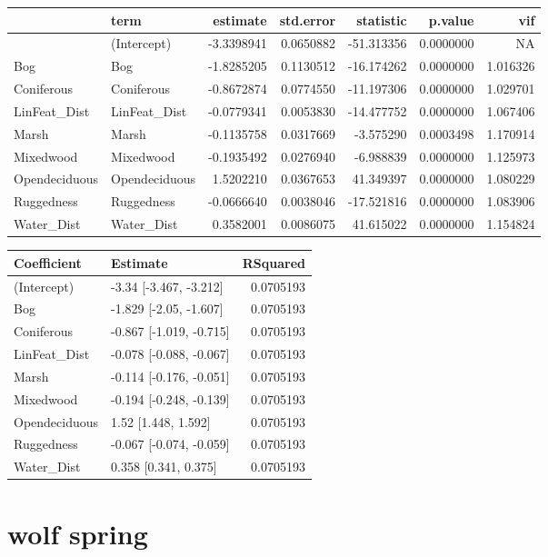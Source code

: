 \documentclass[]{article}
\begin{document}
\begin{tabular}{llrrrrr}
\toprule
  & term & estimate & std.error & statistic & p.value & vif\\
\midrule
 & (Intercept) & -3.3398941 & 0.0650882 & -51.313356 & 0.0000000 & NA\\
Bog & Bog & -1.8285205 & 0.1130512 & -16.174262 & 0.0000000 & 1.016326\\
Coniferous & Coniferous & -0.8672874 & 0.0774550 & -11.197306 & 0.0000000 & 1.029701\\
LinFeat\_Dist & LinFeat\_Dist & -0.0779341 & 0.0053830 & -14.477752 & 0.0000000 & 1.067406\\
Marsh & Marsh & -0.1135758 & 0.0317669 & -3.575290 & 0.0003498 & 1.170914\\
Mixedwood & Mixedwood & -0.1935492 & 0.0276940 & -6.988839 & 0.0000000 & 1.125973\\
Opendeciduous & Opendeciduous & 1.5202210 & 0.0367653 & 41.349397 & 0.0000000 & 1.080229\\
Ruggedness & Ruggedness & -0.0666640 & 0.0038046 & -17.521816 & 0.0000000 & 1.083906\\
Water\_Dist & Water\_Dist & 0.3582001 & 0.0086075 & 41.615022 & 0.0000000 & 1.154824\\
\bottomrule
\end{tabular}

\begin{tabular}{llr}
\toprule
Coefficient & Estimate & RSquared\\
\midrule
(Intercept) & -3.34 [-3.467, -3.212] & 0.0705193\\
Bog & -1.829 [-2.05, -1.607] & 0.0705193\\
Coniferous & -0.867 [-1.019, -0.715] & 0.0705193\\
LinFeat\_Dist & -0.078 [-0.088, -0.067] & 0.0705193\\
Marsh & -0.114 [-0.176, -0.051] & 0.0705193\\
Mixedwood & -0.194 [-0.248, -0.139] & 0.0705193\\
Opendeciduous & 1.52 [1.448, 1.592] & 0.0705193\\
Ruggedness & -0.067 [-0.074, -0.059] & 0.0705193\\
Water\_Dist & 0.358 [0.341, 0.375] & 0.0705193\\
\bottomrule
\end{tabular}

\section{wolf spring}\label{wolf-spring}
\end{document}
